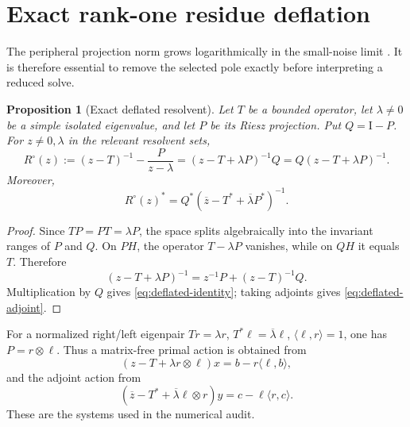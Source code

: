 \documentclass[11pt]{article}
\newtheorem{proposition}[theorem]{Proposition}
\theoremstyle{definition}
\theoremstyle{remark}
\newcommand{\Id}{\mathrm I}
\begin{document}
\section{Exact rank-one residue deflation}
\label{sec:deflation}

The peripheral projection norm grows logarithmically in the small-noise
limit \citep{WangLogConditioning2026}.  It is therefore essential to remove
the selected pole exactly before interpreting a reduced solve.

\begin{proposition}[Exact deflated resolvent]
\label{prop:deflated-resolvent}
Let \(T\) be a bounded operator, let \(\lambda\ne0\) be a simple isolated
eigenvalue, and let \(P\) be its Riesz projection.  Put \(Q=\Id-P\).  For
\(z\ne0,\lambda\) in the relevant resolvent sets,
\begin{equation}
 R^\circ(z)
 :=(z-T)^{-1}-\frac{P}{z-\lambda}
 =(z-T+\lambda P)^{-1}Q
 =Q(z-T+\lambda P)^{-1}.
 \label{eq:deflated-identity}
\end{equation}
Moreover,
\begin{equation}
 R^\circ(z)^*
 =Q^*(\overline z-T^*+\overline\lambda P^*)^{-1}.
 \label{eq:deflated-adjoint}
\end{equation}
\end{proposition}

\begin{proof}
Since \(TP=PT=\lambda P\), the space splits algebraically into the invariant
ranges of \(P\) and \(Q\).  On \(PH\), the operator \(T-\lambda P\)
vanishes, while on \(QH\) it equals \(T\).  Therefore
\[
 (z-T+\lambda P)^{-1}
 =z^{-1}P+(z-T)^{-1}Q.
\]
Multiplication by \(Q\) gives \eqref{eq:deflated-identity}; taking adjoints
gives \eqref{eq:deflated-adjoint}.
\end{proof}

For a normalized right/left eigenpair \(Tr=\lambda r\),
\(T^*\ell=\overline\lambda\ell\), \(\langle\ell,r\rangle=1\), one has
\(P=r\otimes\ell\).  Thus a matrix-free primal action is obtained from
\begin{equation}
 (z-T+\lambda r\otimes\ell)x
 =b-r\langle\ell,b\rangle,
 \label{eq:primal-deflated-solve}
\end{equation}
and the adjoint action from
\begin{equation}
 (\overline z-T^*+\overline\lambda\ell\otimes r)y
 =c-\ell\langle r,c\rangle.
 \label{eq:adjoint-deflated-solve}
\end{equation}
These are the systems used in the numerical audit.
\end{document}
